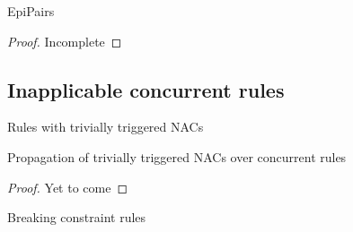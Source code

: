 \begin{thm}{EpiPairs}
  \begin{proof}{Incomplete}
  \end{proof}
\end{thm}

\subsection{Inapplicable concurrent rules}

\begin{definition}{Rules with trivially triggered NACs}
\end{definition}

\begin{thm}{Propagation of trivially triggered NACs over concurrent rules}
  \begin{proof}{Yet to come}
  \end{proof}
\end{thm}

\begin{definition}{Breaking constraint rules}
\end{definition}
